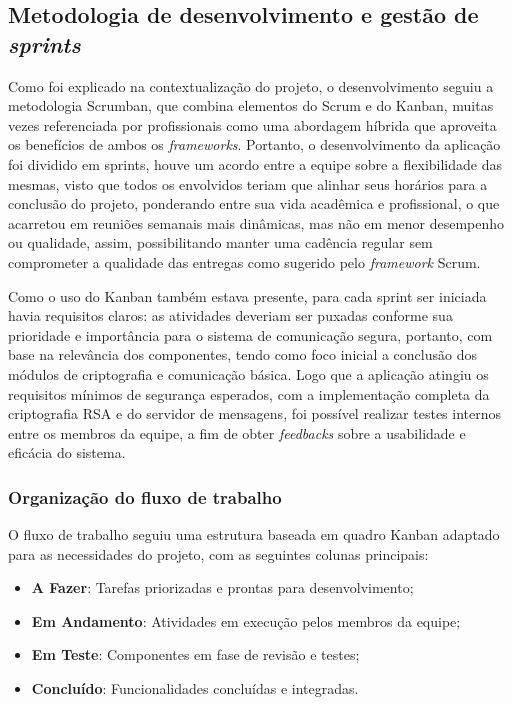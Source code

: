 \subsection{Metodologia de desenvolvimento e gestão de \textit{sprints}}

Como foi explicado na contextualização do projeto, o desenvolvimento
seguiu a metodologia Scrumban, que combina elementos do Scrum e do
Kanban, muitas vezes referenciada por profissionais como uma
abordagem híbrida que aproveita os benefícios de ambos os \textit{frameworks}.
Portanto, o desenvolvimento da aplicação foi dividido em sprints,
houve um acordo entre a equipe sobre a flexibilidade das mesmas,
visto que todos os envolvidos teriam que alinhar seus horários para a
conclusão do projeto, ponderando entre sua vida acadêmica e
profissional, o que acarretou em reuniões semanais mais dinâmicas,
mas não em menor desempenho ou qualidade, assim, possibilitando
manter uma cadência regular sem comprometer a qualidade das entregas
como sugerido pelo \textit{framework} Scrum.

Como o uso do Kanban também estava presente, para cada sprint ser
iniciada havia requisitos claros: as atividades deveriam ser puxadas
conforme sua prioridade e importância para o sistema de comunicação
segura, portanto, com base na relevância dos componentes, tendo como
foco inicial a conclusão dos módulos de criptografia e comunicação
básica. Logo que a aplicação atingiu os requisitos mínimos de
segurança esperados, com a implementação completa da criptografia \acs{RSA}
e do servidor de mensagens, foi possível realizar testes internos
entre os membros da equipe, a fim de obter \textit{feedbacks} sobre a
usabilidade e eficácia do sistema.

\subsubsection{Organização do fluxo de trabalho}

O fluxo de trabalho seguiu uma estrutura baseada em quadro Kanban
adaptado para as necessidades do projeto, com as seguintes colunas principais:

\begin{itemize}
  \item \textbf{A Fazer}: Tarefas priorizadas e prontas para desenvolvimento;
  \item \textbf{Em Andamento}: Atividades em execução pelos membros da equipe;
  \item \textbf{Em Teste}: Componentes em fase de revisão e testes;
  \item \textbf{Concluído}: Funcionalidades concluídas e integradas.
\end{itemize}

